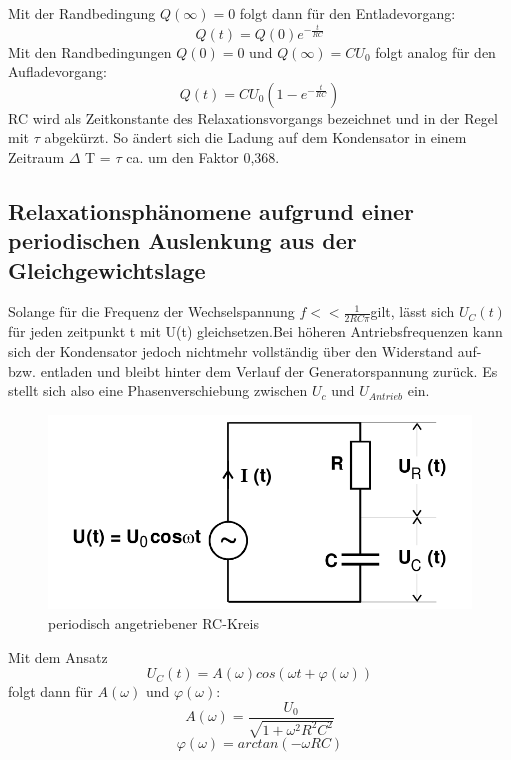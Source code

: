 Mit der Randbedingung $ Q(\infty)=0$ folgt dann für den Entladevorgang:
\begin{equation}
  Q(t) = Q(0) e^{-\frac{t}{RC}}
\end{equation}
Mit den Randbedingungen $Q(0) = 0 $ und $Q(\infty) = CU_0$ folgt analog für
den Aufladevorgang:
\begin{equation}
  Q(t) = CU_0(1-e^{-\frac{t}{RC}})
\end{equation}
RC wird als Zeitkonstante des Relaxationsvorgangs bezeichnet und in der Regel mit
 $\tau$ abgekürzt. So ändert sich die Ladung auf dem Kondensator in einem Zeitraum
 $\Delta$ T = $\tau$ ca. um den Faktor 0,368.

 \subsection{Relaxationsphänomene aufgrund einer periodischen Auslenkung aus der Gleichgewichtslage}

 Solange für die Frequenz der Wechselspannung $ f<<\frac{1}{2RC\pi} $gilt, lässt sich
 $U_C(t)$ für jeden zeitpunkt t mit U(t) gleichsetzen.Bei höheren Antriebsfrequenzen
 kann sich der Kondensator jedoch nichtmehr vollständig über den Widerstand
  auf- bzw. entladen und bleibt hinter dem Verlauf der Generatorspannung zurück.
  Es stellt sich also eine Phasenverschiebung zwischen $U_c$ und $U_{Antrieb}$ ein.

  \begin{figure}[H]
  \centering

  \includegraphics[width=\linewidth-200pt,height=\textheight-200pt,keepaspectratio]{content/RC_Kreis2.png}
  \caption{periodisch angetriebener RC-Kreis}
  \label{fig:RC_Kreis2}
\end{figure}

  Mit dem Ansatz
  \begin{equation}
  U_C(t) = A(\omega)cos(\omega t+\varphi(\omega))
  \end{equation}
  folgt dann für $A(\omega)$ und $\varphi(\omega)$:
  \begin{equation}
    A(\omega) = \frac{U_0}{\sqrt{1+\omega^2R^2C^2}}
  \end{equation}
  \begin{equation}
    \varphi(\omega) = arctan(-\omega RC)
  \end{equation}

